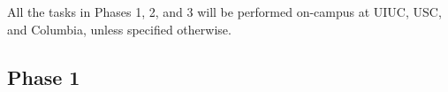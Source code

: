 \begin{comment}
Sub-Task 3.2:  API design to enable developer-memory interaction: 
Annavaram will design the instruction set to be used by the API for programmer's to specify the dominant access mechanisms for each input matrix. 

\noindent
\textbf{Task 4: Architect the 1TBps links} 
Hanumolu will implement I/O interconnect that enables processor-memory communication with a bandwidth in excess of 1TB/s using robust highly digital clocking and signaling architectures amenable for rapid implementation in a 28nm CMOS technology. 
The design will be implemented in HSPICE to simulate the netlists, as well as a bandwidth/latency simulator modeled in software.

\noindent
\textbf{Task 5: Architect the eDRAM cache} 
Seok will implement an eDRAM array circuit that (1) supports spatial and temporal boosting; (2) an adpative technique for power-grid integrity in boosting; and (3) non-invasive thermal sensors and a dynamic thermal management schemes. The design will be implemented in HSPICE as well as a timing simulator modeled in software. 

\noindent
\textbf{Task 6: Design integration into simulator} 
The corelet microarchitecture simulator will be integrated with elastic cache simulator, eDRAM cache simulator and DRAMsim.  16 tiles will be integrated with 1TBps link and the entire simulator is configured to run GAMA in the simulation mode 

\end{comment}

\noindent
All the tasks in Phases 1, 2, and 3 will be performed on-campus at UIUC, USC, and Columbia, unless specified otherwise.

\noindent
\subsection{Phase 1}


